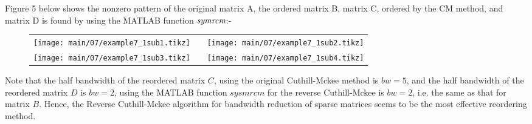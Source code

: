   \newpage
  \noindent
  \rmfamily
  Figure 5 below shows the nonzero pattern of the original matrix A, the ordered
  matrix B, matrix C, ordered by the CM method, and matrix D is found by using the
  MATLAB function $\emph{symrcm}$:-
  \begin{figure}[H]
    \begin{center}
      \tiny
      \begin{tabular}{ccc}
        \texttt{[image: main/07/example7\_1sub1.tikz]}&&
        \texttt{[image: main/07/example7\_1sub2.tikz]}\\
        \texttt{[image: main/07/example7\_1sub3.tikz]}&&
        \texttt{[image: main/07/example7\_1sub4.tikz]}\\
      \end{tabular}
    \end{center}
  \end{figure}
  \vskip 10pt
  Note that the half bandwidth of the reordered matrix $C$, using the original
  Cuthill-Mckee method is $bw =5$, and the half bandwidth of the reordered matrix
  $D$ is $bw =2$, using the MATLAB function $sysmrcm$ for the reverse
  Cuthill-Mckee is $bw =2$, i.e. the same as that for matrix $B$. Hence, the
  Reverse Cuthill-Mckee algorithm for bandwidth reduction of sparse matrices seems
  to be the most effective reordering method.
  \vskip 6pt
  \noindent
  \newpage
  \rmfamily
  \vskip 12pt
  \noindent
